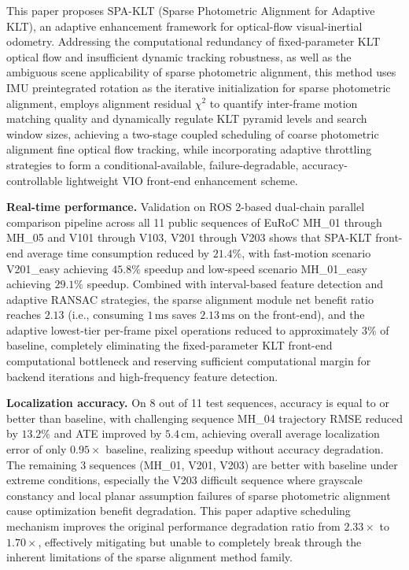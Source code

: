 \documentclass[journal,twoside,web]{ieeecolor}
\begin{document}
This paper proposes SPA-KLT (Sparse Photometric Alignment for Adaptive KLT), an adaptive enhancement framework for optical-flow visual-inertial odometry. Addressing the computational redundancy of fixed-parameter KLT optical flow and insufficient dynamic tracking robustness, as well as the ambiguous scene applicability of sparse photometric alignment, this method uses IMU preintegrated rotation as the iterative initialization for sparse photometric alignment, employs alignment residual $\chi^{2}$ to quantify inter-frame motion matching quality and dynamically regulate KLT pyramid levels and search window sizes, achieving a two-stage coupled scheduling of coarse photometric alignment fine optical flow tracking, while incorporating adaptive throttling strategies to form a conditional-available, failure-degradable, accuracy-controllable lightweight VIO front-end enhancement scheme.

\textbf{Real-time performance.} Validation on ROS 2-based dual-chain parallel comparison pipeline across all 11 public sequences of EuRoC MH\_01 through MH\_05 and V101 through V103, V201 through V203 shows that SPA-KLT front-end average time consumption reduced by $21.4\%$, with fast-motion scenario V201\_easy achieving $45.8\%$ speedup and low-speed scenario MH\_01\_easy achieving $29.1\%$ speedup. Combined with interval-based feature detection and adaptive RANSAC strategies, the sparse alignment module net benefit ratio reaches $2.13$ (i.e., consuming $1\,\mathrm{ms}$ saves $2.13\,\mathrm{ms}$ on the front-end), and the adaptive lowest-tier per-frame pixel operations reduced to approximately $3\%$ of baseline, completely eliminating the fixed-parameter KLT front-end computational bottleneck and reserving sufficient computational margin for backend iterations and high-frequency feature detection.

\textbf{Localization accuracy.} On 8 out of 11 test sequences, accuracy is equal to or better than baseline, with challenging sequence MH\_04 trajectory RMSE reduced by $13.2\%$ and ATE improved by $5.4\,\mathrm{cm}$, achieving overall average localization error of only $0.95\times$ baseline, realizing speedup without accuracy degradation. The remaining 3 sequences (MH\_01, V201, V203) are better with baseline under extreme conditions, especially the V203 difficult sequence where grayscale constancy and local planar assumption failures of sparse photometric alignment cause optimization benefit degradation. This paper adaptive scheduling mechanism improves the original performance degradation ratio from $2.33\times$ to $1.70\times$, effectively mitigating but unable to completely break through the inherent limitations of the sparse alignment method family.
\end{document}
